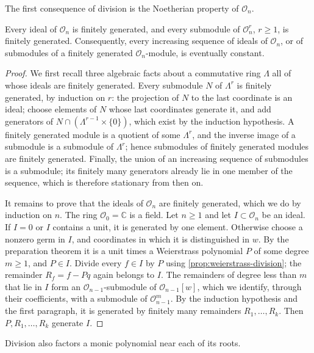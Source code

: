 The first consequence of division is the Noetherian property of $\mathcal O_n$.

\begin{proposition}\label{prop:analytic-noetherian}
Every ideal of $\mathcal O_n$ is finitely generated, and every submodule of $\mathcal O_n^r$, $r\geq1$, is finitely generated. Consequently, every increasing sequence of ideals of $\mathcal O_n$, or of submodules of a finitely generated $\mathcal O_n$-module, is eventually constant.
\end{proposition}
\begin{proof}
We first recall three algebraic facts about a commutative ring $\Lambda$ all of whose ideals are finitely generated. Every submodule $N$ of $\Lambda^r$ is finitely generated, by induction on $r$: the projection of $N$ to the last coordinate is an ideal; choose elements of $N$ whose last coordinates generate it, and add generators of $N\cap(\Lambda^{r-1}\times\{0\})$, which exist by the induction hypothesis. A finitely generated module is a quotient of some $\Lambda^r$, and the inverse image of a submodule is a submodule of $\Lambda^r$; hence submodules of finitely generated modules are finitely generated. Finally, the union of an increasing sequence of submodules is a submodule; its finitely many generators already lie in one member of the sequence, which is therefore stationary from then on.

It remains to prove that the ideals of $\mathcal O_n$ are finitely generated, which we do by induction on $n$. The ring $\mathcal O_0=\mathbb C$ is a field. Let $n\geq1$ and let $I\subset\mathcal O_n$ be an ideal. If $I=0$ or $I$ contains a unit, it is generated by one element. Otherwise choose a nonzero germ in $I$, and coordinates in which it is distinguished in $w$. By the preparation theorem it is a unit times a Weierstrass polynomial $P$ of some degree $m\geq1$, and $P\in I$. Divide every $f\in I$ by $P$ using \cref{prop:weierstrass-division}; the remainder $R_f=f-Pq$ again belongs to $I$. The remainders of degree less than $m$ that lie in $I$ form an $\mathcal O_{n-1}$-submodule of $\mathcal O_{n-1}[w]$, which we identify, through their coefficients, with a submodule of $\mathcal O_{n-1}^m$. By the induction hypothesis and the first paragraph, it is generated by finitely many remainders $R_1,\ldots,R_k$. Then $P,R_1,\ldots,R_k$ generate $I$.
\end{proof}

Division also factors a monic polynomial near each of its roots.

